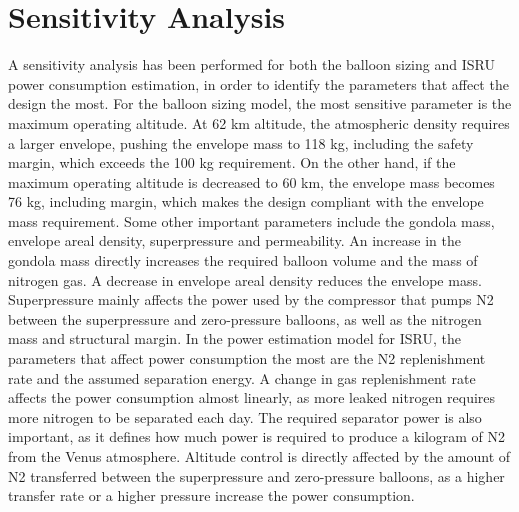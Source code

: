 \section{Sensitivity Analysis}
A sensitivity analysis has been performed for both the balloon sizing and ISRU power consumption estimation, in order to identify the parameters that affect the design the most. For the balloon sizing model, the most sensitive parameter is the maximum operating altitude. At 62 km altitude, the atmospheric density requires a larger envelope, pushing the envelope mass to 118 kg, including the safety margin, which exceeds the 100 kg requirement. On the other hand, if the maximum operating altitude is decreased to 60 km, the envelope mass becomes 76 kg, including margin, which makes the design compliant with the envelope mass requirement.
Some other important parameters include the gondola mass, envelope areal density, superpressure and permeability. An increase in the gondola mass directly increases the required balloon volume and the mass of nitrogen gas. A decrease in envelope areal density reduces the envelope mass. Superpressure mainly affects the power used by the compressor that pumps N2 between the superpressure and zero-pressure balloons, as well as the nitrogen mass and structural margin.
\newline
In the power estimation model for ISRU, the parameters that affect power consumption the most are the N2 replenishment rate and the assumed separation energy. A change in gas replenishment rate affects the power consumption almost linearly, as more leaked nitrogen requires more nitrogen to be separated each day. The required separator power is also important, as it defines how much power is required to produce a kilogram of N2 from the Venus atmosphere.
Altitude control is directly affected by the amount of N2 transferred between the superpressure and zero-pressure balloons, as a higher transfer rate or a higher pressure increase the power consumption.


